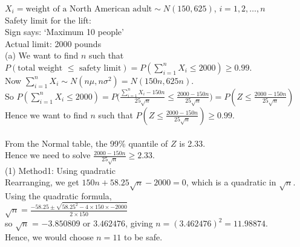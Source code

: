 \documentclass[bigtut]{tutorial}\usepackage[]{graphicx}\usepackage[]{color}
\begin{document}
\begin{tutorial}
\begin{questions}


\begin{solution}

$X_{i} = \text{weight of a North American
adult} \sim N(150,625)$, $i=1,2,\ldots,n$\\

Safety limit for the lift: \\
Sign says: `Maximum 10 people'  \\
Actual limit: 2000 pounds \\
                        
(a)
We want to find $n$ such that $P(\text{total weight $\leq$  safety limit}) = P(\sum_{i=1}^{n} X_{i} \leq 2000) \geq 0.99$. \\

Now $\sum_{i=1}^{n} X_{i} \sim N( n \mu, n \sigma^2) 
= N( 150n, 625n)$. \\

So $P( \sum_{i=1}^{n} X_{i} \leq 2000)  = P \big( \frac{
\sum_{i=1}^{n} X_{i} - 150n}{25\sqrt{n}} \leq \frac{
2000 - 150n}{25\sqrt{n}} \big) = P(Z \leq \frac{
2000 - 150n}{25\sqrt{n}} ) $ \\

Hence we want to find $n$ such that
$P(Z \leq \frac{ 2000 - 150n}{25\sqrt{n}} ) \geq 0.99$. \\
\\

From the Normal table, the 99\% quantile of $Z$ is 2.33. \\

Hence we need to solve $\frac{ 2000 - 150n}{25\sqrt{n}} \geq 2.33$. \\

(1) Method1: Using quadratic \\
Rearranging, we get $150n +58.25 \sqrt{n} -2000 = 0$, 
which is a quadratic in $\sqrt{n}$. \\

Using the quadratic formula, \\
$\sqrt{n} = \frac{ -58.25 \pm \sqrt{58.25^2- 4 \times 150 \times -2000}}{2 \times 150}$ \\
so $\sqrt{n}$ = $-3.850809$ or $3.462476$,
giving $n = (3.462476)^2 = 11.98874$. \\
Hence, we would choose $n=11$ to be safe. \\


\end{solution}
\end{questions}
\end{tutorial}
\end{document}
